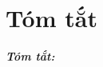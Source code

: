\chapter*{\foreignlanguage{vietnamese}{Tóm tắt}}
\foreignlanguage{vietnamese}{
\textit{\textbf{Tóm tắt:}} 
}
